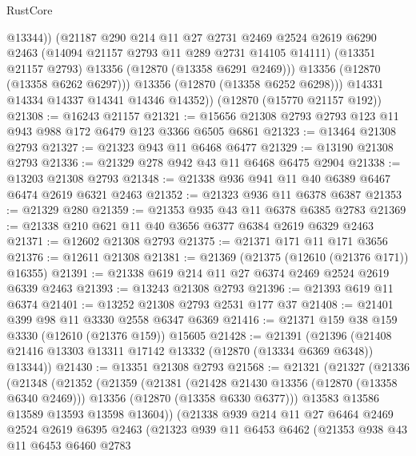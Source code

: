 \begin{lexlean}{RustCore}
\begin{coremodule}
                @13344))
            (@21187
              @290
              @214
              @11
              @27
              @2731
              @2469
              @2524
              @2619
              @6290
              @2463
              (@14094 @21157 @2793 @11 @289 @2731 @14105 @14111)
              (@13351 @21157 @2793)
              @13356
              (@12870 (@13358 @6291 @2469)))
            @13356
            (@12870 (@13358 @6262 @6297)))
          @13356
          (@12870 (@13358 @6252 @6298)))
        @14331
        @14334
        @14337
        @14341
        @14346
        @14352))
    (@12870 (@15770 @21157 @192))
@21308 := @16243 @21157
@21321 := @15656 @21308 @2793 @2793 @123 @11 @943 @988 @172 @6479 @123 @3366 @6505 @6861
@21323 := @13464 @21308 @2793
@21327 := @21323 @943 @11 @6468 @6477
@21329 := @13190 @21308 @2793
@21336 := @21329 @278 @942 @43 @11 @6468 @6475 @2904
@21338 := @13203 @21308 @2793
@21348 := @21338 @936 @941 @11 @40 @6389 @6467 @6474 @2619 @6321 @2463
@21352 := @21323 @936 @11 @6378 @6387
@21353 := @21329 @280
@21359 := @21353 @935 @43 @11 @6378 @6385 @2783
@21369 := @21338 @210 @621 @11 @40 @3656 @6377 @6384 @2619 @6329 @2463
@21371 := @12602 @21308 @2793
@21375 := @21371 @171 @11 @171 @3656
@21376 := @12611 @21308
@21381 := @21369 (@21375 (@12610 (@21376 @171)) @16355)
@21391 := @21338 @619 @214 @11 @27 @6374 @2469 @2524 @2619 @6339 @2463
@21393 := @13243 @21308 @2793
@21396 := @21393 @619 @11 @6374
@21401 := @13252 @21308 @2793 @2531 @177 @37
@21408 := @21401 @399 @98 @11 @3330 @2558 @6347 @6369
@21416 := @21371 @159 @38 @159 @3330 (@12610 (@21376 @159)) @15605
@21428 := @21391
    (@21396 (@21408 @21416 @13303 @13311 @17142 @13332 (@12870 (@13334 @6369 @6348)) @13344))
@21430 := @13351 @21308 @2793
@21568 := @21321
    (@21327
      (@21336
        (@21348
          (@21352
            (@21359
              (@21381
                (@21428 @21430 @13356 (@12870 (@13358 @6340 @2469)))
                @13356
                (@12870 (@13358 @6330 @6377)))
              @13583
              @13586
              @13589
              @13593
              @13598
              @13604))
          (@21338
            @939
            @214
            @11
            @27
            @6464
            @2469
            @2524
            @2619
            @6395
            @2463
            (@21323
              @939
              @11
              @6453
              @6462
              (@21353
                @938
                @43
                @11
                @6453
                @6460
                @2783

\end{coremodule}
\end{lexlean}
